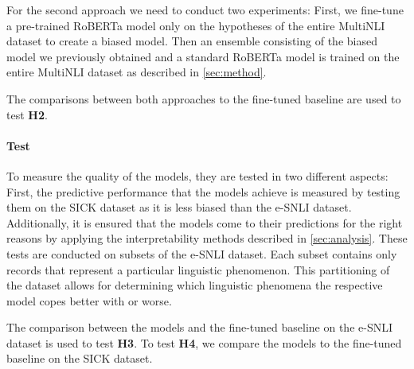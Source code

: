 For the second approach we need to conduct two experiments: First, we fine-tune a pre-trained \ac{RoBERTa} model only on the hypotheses of the entire \ac{MultiNLI} dataset to create a biased model. Then an ensemble consisting of the biased model we previously obtained and a standard \ac{RoBERTa} model is trained on the entire \ac{MultiNLI} dataset as described in \autoref{sec:method}.

The comparisons between both approaches to the fine-tuned baseline are used to test \textbf{H2}.

\paragraph{Test} To measure the quality of the models, they are tested in two different aspects: First, the predictive performance that the models achieve is measured by testing them on the SICK dataset as it is less biased than the \ac{e-SNLI} dataset. Additionally, it is ensured that the models come to their predictions for the right reasons by applying the interpretability methods described in \autoref{sec:analysis}. These tests are conducted on subsets of the \ac{e-SNLI} dataset. Each subset contains only records that represent a particular linguistic phenomenon. This partitioning of the dataset allows for determining which linguistic phenomena the respective model copes better with or worse.

The comparison between the models and the fine-tuned baseline on the \ac{e-SNLI} dataset is used to test \textbf{H3}. To test \textbf{H4}, we compare the models to the fine-tuned baseline on the \ac{SICK} dataset.
